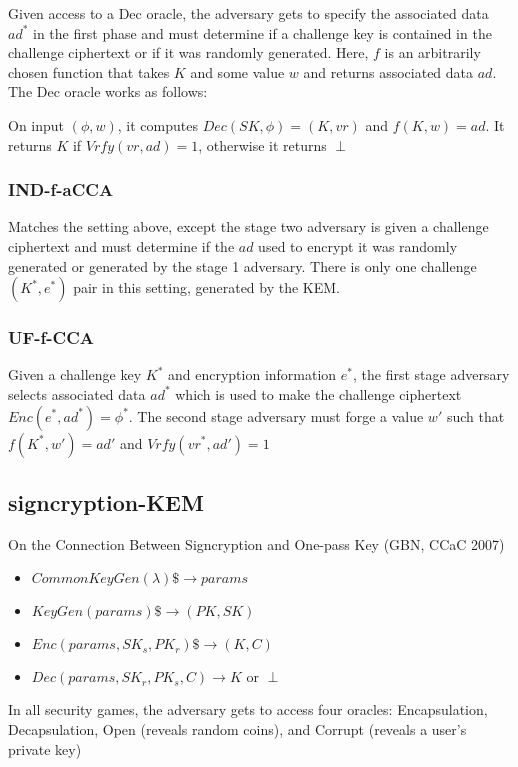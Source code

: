 \documentclass[11pt, pdftex]{article}
\begin{document}
Given access to a Dec oracle, the adversary gets to specify the associated data $ad^*$ in the first phase and must determine if a challenge key is contained in the challenge ciphertext or if it was randomly generated.  Here, $f$ is an arbitrarily chosen function that takes $K$ and some value $w$ and returns associated data $ad$.  The Dec oracle works as follows:

On input $(\phi,w)$, it computes $Dec(SK,\phi) = (K,vr)$ and $f(K,w) = ad$.  It returns $K$ if $Vrfy(vr, ad) = 1$, otherwise it returns $\perp$

\subsubsection{IND-f-aCCA}

Matches the setting above, except the stage two adversary is given a challenge ciphertext and must determine if the $ad$ used to encrypt it
was randomly generated or generated by the stage 1 adversary.  There is only one challenge $(K^*,e^*)$ pair in this setting, generated by the KEM.

\subsubsection{UF-f-CCA}

Given a challenge key $K^*$ and encryption information $e^*$, the first stage adversary 
selects associated data $ad^*$ which is used to make the challenge ciphertext $Enc(e^*,ad^*) = \phi^*$.  
The second stage adversary must forge a value $w'$ such that $f(K^*,w') = ad'$ and $Vrfy(vr^*,ad') = 1$

\subsection{signcryption-KEM} 
On the Connection Between Signcryption and One-pass Key (GBN, CCaC 2007)
\begin{itemize}
\item $CommonKeyGen(\lambda) \$\rightarrow params$
\item $KeyGen(params) \$\rightarrow (PK, SK)$
\item $Enc(params, SK_s, PK_r) \$\rightarrow (K, C)$
\item $Dec(params, SK_r, PK_s, C) \rightarrow K \text{ or }\perp$
\end{itemize}

In all security games, the adversary gets to access four oracles: Encapsulation, Decapsulation, 
Open (reveals random coins), and Corrupt (reveals a user's private key)
\end{document}
